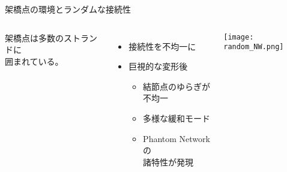\begin{columns}[totalwidth=.85\linewidth]
\begin{itembox}[l]{架橋点の環境とランダムな接続性\cite{flory}}
\begin{columns}[totalwidth=\textwidth]
					\small
					架橋点は\alert{多数のストランド}に\\囲まれている。
					\begin{itemize}
						\item 接続性を不均一に
						\item 巨視的な変形後
							\begin{itemize}
								\normalsize
								\item \alert{結節点のゆらぎが\\不均一}
								\item 多様な緩和モード
							\item \alert{Phantom Network の\\諸特性が発現}
							\end{itemize}
					\end{itemize}
					\centering
					\texttt{[image: random\_NW.png]}
			\end{columns}
		\end{itembox}
\end{columns}